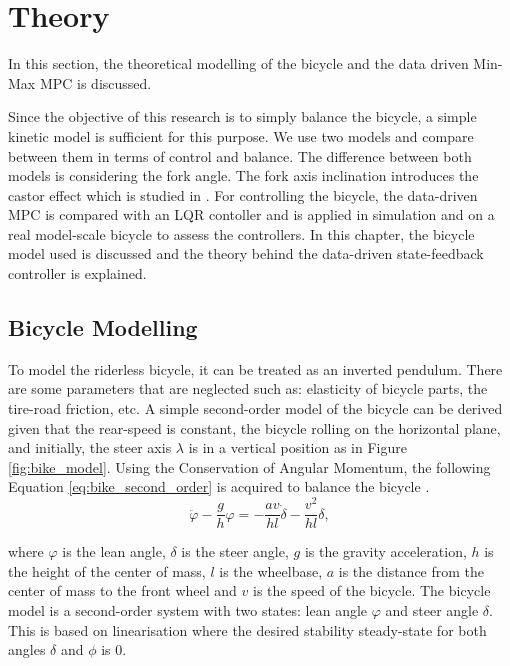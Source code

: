 \chapter{Theory}
\label{chap:theory}
In this section, the theoretical modelling of the bicycle and the data driven Min-Max MPC is discussed.

Since the objective of this research is to simply balance the bicycle, a simple kinetic model is sufficient for this purpose. We use two models and compare between them in terms of control and balance.
The difference between both models is considering the fork angle.
The fork axis inclination introduces the castor effect which is studied in \cite{yu2018}.
For controlling the bicycle, the data-driven MPC is compared with an LQR contoller and is applied in simulation and on a real model-scale bicycle to assess the controllers. In this chapter, the bicycle model used is discussed and the theory behind the data-driven state-feedback controller is explained.

\section{Bicycle Modelling}
\label{sec:bike_modelling}
	To model the riderless bicycle, it can be treated as an inverted pendulum. There are some parameters that are neglected such as: elasticity of bicycle parts, the tire-road friction, etc. A simple second-order model of the bicycle can be derived given that the rear-speed is constant, the bicycle rolling on the horizontal plane, and initially, the steer axis $\lambda$ is in a vertical position as in Figure \ref{fig:bike_model}. Using the Conservation of Angular Momentum, the following Equation \ref{eq:bike_second_order} is acquired to balance the bicycle \cite{astrom2005bicycle}.
	\begin{equation}
		\label{eq:bike_second_order}
		\ddot{\varphi} - \frac{g}{h} \varphi = - \frac{av}{hl} \dot{\delta} - \frac{v^2}{h l} \delta,
	\end{equation}

	where $\varphi$ is the lean angle, $\delta$ is the steer angle, $g$ is the gravity acceleration, $h$ is the height of the center of mass, $l$ is the wheelbase, $a$ is the distance from the center of mass to the front wheel and $v$ is the speed of the bicycle. The bicycle model is a second-order system with two states: lean angle $\varphi$ and steer angle $\delta$.
	This is based on linearisation where the desired stability steady-state for both angles $\delta$ and $\phi$ is 0.

